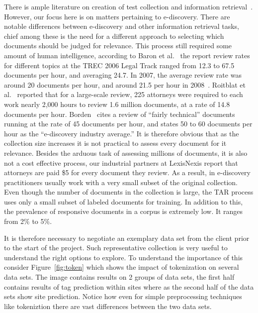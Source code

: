 \documentclass{sig-alternate-05-2015}
\begin{document}
There is ample literature on creation of test collection and information retrieval~\cite{sanderson2010test}. However, our focus here is on matters pertaining to e-discovery. There are notable differences between e-discovery and other information retrieval tasks, chief among these is the need for a different approach to selecting which documents should be judged for relevance. This process still required some amount of human intelligence, according to Baron et al.~\cite{baron2006trec} the report review rates for different topics at the TREC 2006 Legal Track ranged from 12.3 to 67.5 documents per hour, and averaging 24.7. In 2007, the average review rate was around 20 documents per hour, and around 21.5 per hour in 2008~\cite{oard08}. Roitblat et al.~\cite{roitblat} reported that for a large-scale review, 225 attorneys were required to each work nearly 2,000 hours to review 1.6 million documents, at a rate of 14.8 documents per hour. Borden~\cite{borden} cites a review of ``fairly technical'' documents running at the rate of 45 documents per hour, and states 50 to 60 documents per hour as the ``e-discovery industry average.'' It is therefore obvious that as the collection size increases it is not practical to assess every document for it relevance. Besides the arduous task of assessing millions of documents, it is also not a cost effective process, our industrial partners at LexisNexis report that attorneys are paid \$5 for every document they review. As a result, in e-discovery practitioners usually work with a very small subset of the original collection. Even though the number of documents in the collection is large, the TAR process uses only a small subset of labeled documents for training. In addition to this, the prevalence of responsive documents in a corpus is extremely low. It ranges from 2\% to 5\%. 

It is therefore necessary to negotiate an exemplary data set from the client prior to the start of the project. Such representative collection is very useful to understand the right options to explore. To understand the importance of this consider Figure~\ref{fig:token} which shows the impact of tokenization on several data sets. The image contains results on 2 groups of data sets, the first half contains results of tag prediction within sites where as the second half of the data sets show site prediction. Notice how even for simple preprocessing techniques like tokeniztion there are vast differences between the two data sets.
\end{document}
